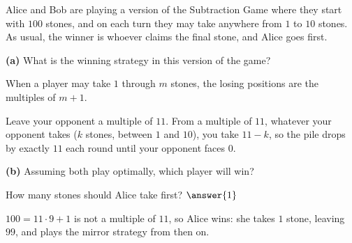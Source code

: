 \documentclass[12pt]{ximera}
\begin{document}
\begin{problem}
Alice and Bob are playing a version of the Subtraction Game where they start with $100$
stones, and on each turn they may take anywhere from $1$ to $10$ stones. As usual, the
winner is whoever claims the final stone, and Alice goes first.

\begin{prompt}
\textbf{(a)} What is the winning strategy in this version of the game?

\begin{freeResponse}
\end{freeResponse}

\begin{hint}
When a player may take $1$ through $m$ stones, the losing positions are the multiples of
$m+1$.
\end{hint}

\begin{feedback}
Leave your opponent a multiple of $11$. From a multiple of $11$, whatever your opponent
takes ($k$ stones, between $1$ and $10$), you take $11-k$, so the pile drops by exactly
$11$ each round until your opponent faces $0$.
\end{feedback}
\end{prompt}

\begin{prompt}
\textbf{(b)} Assuming both play optimally, which player will win?

\begin{multipleChoice}
\end{multipleChoice}

How many stones should Alice take first? $\answer{1}$

\begin{feedback}
$100=11\cdot 9+1$ is not a multiple of $11$, so Alice wins: she takes $1$ stone, leaving
$99$, and plays the mirror strategy from then on.
\end{feedback}
\end{prompt}
\end{problem}
\end{document}
